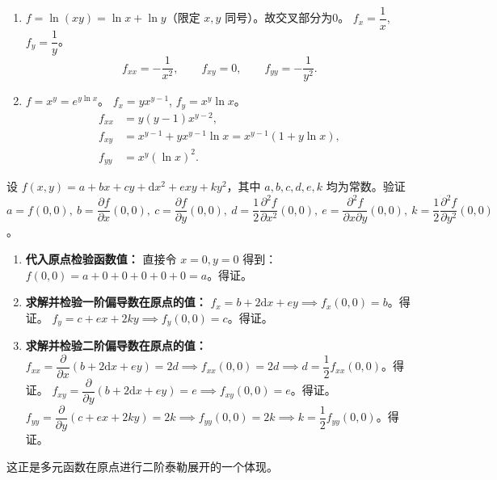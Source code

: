 \documentclass[lang=cn,11pt]{elegantbook}
\begin{document}
\begin{solution}
\begin{enumerate}
  \item[(7)] $f = \ln(xy) = \ln x + \ln y$（限定 $x,y$ 同号）。故交叉部分为0。
  $f_x = \dfrac{1}{x}$, $f_y = \dfrac{1}{y}$。
  \[
  f_{xx} = -\frac{1}{x^2}, \qquad f_{xy} = 0, \qquad f_{yy} = -\frac{1}{y^2}.
  \]

  \item[(8)] $f = x^y = e^{y\ln x}$。
  $f_x = y x^{y-1}$, \quad $f_y = x^y\ln x$。
  \begin{align*}
  f_{xx} &= y(y-1)x^{y-2},\\
  f_{xy} &= x^{y-1} + y x^{y-1}\ln x = x^{y-1}(1+y\ln x),\\
  f_{yy} &= x^y(\ln x)^2.
  \end{align*}
\end{enumerate}
\end{solution}

\begin{exercise}[二阶偏导数在原点的值]
设 $f(x,y) = a+bx+cy+\mathrm{d}x^2+exy+ky^2$，其中 $a,b,c,d,e,k$ 均为常数。验证 $a = f(0,0),\ b = \dfrac{\partial f}{\partial x}(0,0),\ c = \dfrac{\partial f}{\partial y}(0,0),\ d = \dfrac{1}{2}\dfrac{\partial^2 f}{\partial x^2}(0,0),\ e = \dfrac{\partial^2 f}{\partial x\partial y}(0,0),\ k = \dfrac{1}{2}\dfrac{\partial^2 f}{\partial y^2}(0,0)$。
\end{exercise}

\begin{solution}
\begin{enumerate}
  \item \textbf{代入原点检验函数值：}
  直接令 $x=0, y=0$ 得到：
  $f(0,0) = a + 0 + 0 + 0 + 0 + 0 = a$。得证。
  
  \item \textbf{求解并检验一阶偏导数在原点的值：}
  $f_x = b + 2\mathrm{d}x + ey \implies f_x(0,0) = b$。得证。
  $f_y = c + ex + 2ky \implies f_y(0,0) = c$。得证。
  
  \item \textbf{求解并检验二阶偏导数在原点的值：}
  $f_{xx} = \dfrac{\partial}{\partial x}(b + 2\mathrm{d}x + ey) = 2d \implies f_{xx}(0,0) = 2d \implies d = \dfrac{1}{2}f_{xx}(0,0)$。得证。
  $f_{xy} = \dfrac{\partial}{\partial y}(b + 2\mathrm{d}x + ey) = e \implies f_{xy}(0,0) = e$。得证。
  $f_{yy} = \dfrac{\partial}{\partial y}(c + ex + 2ky) = 2k \implies f_{yy}(0,0) = 2k \implies k = \dfrac{1}{2}f_{yy}(0,0)$。得证。
\end{enumerate}
这正是多元函数在原点进行二阶泰勒展开的一个体现。
\end{solution}
\end{document}
